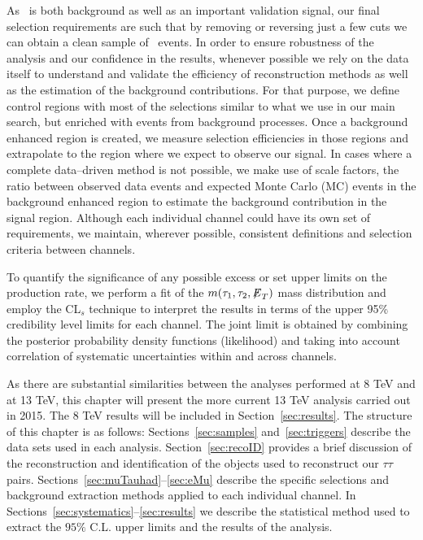 As \zditau ~is both background as well as an important validation signal, our final selection requirements are such that by removing or
reversing just a few cuts we can obtain a clean sample of \zditau ~events. In order to ensure robustness of the analysis and our
confidence in the results, whenever possible we rely on the data itself to understand and validate the efficiency of reconstruction
methods as well as the estimation of the background contributions. For that purpose, we define control regions with most of the
selections similar to what we use in our main search, but enriched with events from background processes. Once a background enhanced
region is created, we measure selection efficiencies in those regions and  extrapolate to the region  where we expect to observe our
signal. In cases where a complete data--driven method is not possible, we make use of scale factors, the ratio between observed data events
and expected Monte Carlo (MC) events in the background enhanced region to estimate the background  contribution in the signal region. Although each
individual channel could have its own set of requirements, we maintain, wherever possible, consistent definitions and selection
criteria between channels.

To quantify the significance of any possible excess or set upper limits on the production rate, we perform a fit of the $m(\tau_{1},\tau_{2},{\not\mathrel{E}}_T)$ mass 
distribution and employ the CL$_{s}$ technique to interpret the results in terms of the upper 95\% credibility level limits
for each channel. The joint limit is obtained by combining the posterior probability density functions (likelihood) and taking into
account correlation of systematic uncertainties within and across channels.

As there are substantial similarities between the analyses performed at 8 TeV and at 13 TeV, this chapter will present the more current 13 TeV analysis carried out in 2015. The 8 TeV results will be included in Section~\ref{sec:results}. The structure of this chapter is as follows: Sections~\ref{sec:samples} and~\ref{sec:triggers} describe the data sets used in each analysis.  Section~\ref{sec:recoID} provides a brief discussion of the reconstruction and identification of the objects used to reconstruct our  $\tau\tau$ 
pairs.
Sections~\ref{sec:muTauhad}--\ref{sec:eMu} describe the specific selections and background extraction methods applied  to each
individual channel. In Sections~\ref{sec:systematics}--\ref{sec:results} we describe the statistical method used to extract 
the $95\%$ C.L. upper limits and the results of the analysis. 
  
